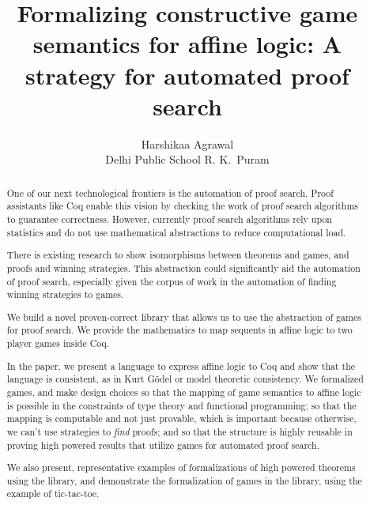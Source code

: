 \documentclass{article}
\title{Formalizing constructive game semantics for affine logic: A strategy for automated proof search}
\author{Harshikaa Agrawal \\ \small Delhi Public School R. K.\ Puram}
\date{}
\theoremstyle{definition}
\begin{document}
\linespread{1.2}

\maketitle

\begin{abstract}
    

One of our next technological frontiers is the automation of proof search. Proof assistants like Coq enable this vision by checking the work of proof search algorithms to guarantee correctness. However, currently proof search algorithms rely upon statistics and do not use mathematical abstractions to reduce computational load. 

There is existing research to show isomorphisms between theorems and games, and proofs and winning strategies. This abstraction could significantly aid the automation of proof search, especially given the corpus of work in the automation of finding winning strategies to games.

We build a novel proven-correct library that allows us to use the abstraction of games for proof search. We provide the mathematics to map sequents in affine logic to two player games inside Coq. 

In the paper, we present a language to express affine logic to Coq and show that the language is consistent, as in Kurt Gödel or model theoretic consistency.  We formalized games, and make design choices so that the mapping of game semantics to affine logic is possible in the constraints of type theory and functional programming; so that the mapping is computable and not just provable, which is important because otherwise, we can’t use strategies to \emph{find} proofs; and so that the structure is highly reusable in proving high powered results that utilize games for automated proof search.

We also present, representative examples of formalizations of high powered theorems using the library, and demonstrate the formalization of games in the library, using the example of tic-tac-toe.

\end{abstract}

\clearpage
\begin{doublespace}
\tableofcontents
\end{doublespace}

\begin{comment}

Table of contents
Introduction: Opportunity, Our Idea, Our Contribution
Project Background: Proof Assistants, Affine Logic, Modelling proofs through game semantics, Summary
Library Design: Affine Logic, Model of Affine Logic, Formal Game, Seminal definition 
Examples: Theorems, Games
Acknowledgments 
Bibliography
\end{comment}
\end{document}
